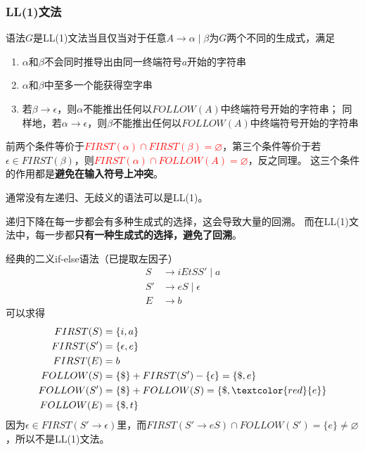 \subsubsection{LL(1)文法}
\begin{definition}
语法$G$是LL(1)文法当且仅当对于任意$A\to\alpha\mid\beta$为$G$两个不同的生成式，满足
\begin{enumerate}
	\item $\alpha$和$\beta$不会同时推导出由同一终端符号$a$开始的字符串
	\item $\alpha$和$\beta$中至多一个能获得空字串
	\item 若$\beta\to\epsilon$，则$\alpha$不能推出任何以$FOLLOW(A)$中终端符号开始的字符串；
	同样地，若$\alpha\to\epsilon$，则$\beta$不能推出任何以$FOLLOW(A)$中终端符号开始的字符串
\end{enumerate}
前两个条件等价于\textcolor{red}{$FIRST(\alpha)\cap FIRST(\beta)=\varnothing$}，第三个条件等价于若$\epsilon\in FIRST(\beta)$，则\textcolor{red}{$FIRST(\alpha)\cap FOLLOW(A)=\varnothing$}，反之同理。
这三个条件的作用都是\textbf{避免在输入符号上冲突}。
\end{definition}
通常没有左递归、无歧义的语法可以是LL(1)。

递归下降在每一步都会有多种生成式的选择，这会导致大量的回溯。
而在LL(1)文法中，每一步都\textbf{只有一种生成式的选择，避免了回溯}。

\begin{example}
经典的二义if-else语法（已提取左因子）
\[\begin{aligned}
S &\to iEtSS'\mid a\\
S' &\to eS\mid\epsilon\\
E &\to b
\end{aligned}\]
可以求得
\[\begin{aligned}
FIRST(S) &= \{i,a\}\\
FIRST(S') &= \{\epsilon,e\}\\
FIRST(E) &= b\\
FOLLOW(S) &= \{\$\} + FIRST(S')-\{\epsilon\}=\{\$,e\}\\
FOLLOW(S') &= \{\$\} + FOLLOW(S) = \{\$,\textcolor{red}{e}\}\\
FOLLOW(E) &= \{\$,t\}
\end{aligned}\]
因为$\epsilon\in FIRST(S'\to\epsilon)$里，而$FIRST(S'\to eS)\cap FOLLOW(S')=\{e\}\ne\varnothing$，所以不是LL(1)文法。
\end{example}

